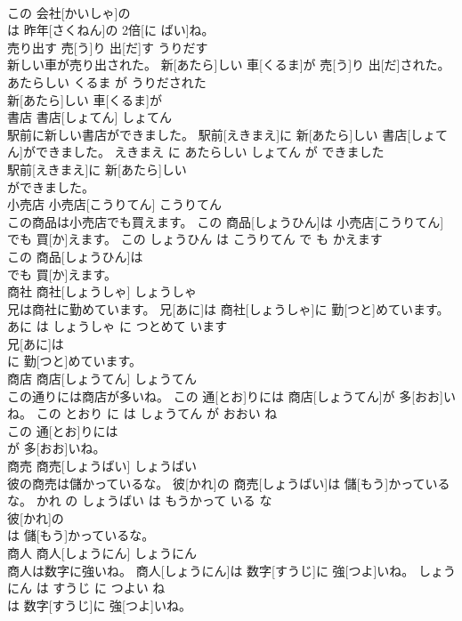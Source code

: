 \documentclass[8pt]{extreport}
\begin{document}
\begin{CJK}{UTF8}{min}
\\	この 会社[かいしゃ]の
\\	は 昨年[さくねん]の 2倍[に ばい]ね。			
\\	売り出す	売[う]り 出[だ]す	うりだす	
\\	新しい車が売り出された。	新[あたら]しい 車[くるま]が 売[う]り 出[だ]された。	あたらしい くるま が うりだされた	
\\	新[あたら]しい 車[くるま]が
\\	書店	書店[しょてん]	しょてん	
\\	駅前に新しい書店ができました。	駅前[えきまえ]に 新[あたら]しい 書店[しょてん]ができました。	えきまえ に あたらしい しょてん が できました	
\\	駅前[えきまえ]に 新[あたら]しい
\\	ができました。			
\\	小売店	小売店[こうりてん]	こうりてん	
\\	この商品は小売店でも買えます。	この 商品[しょうひん]は 小売店[こうりてん]でも 買[か]えます。	この しょうひん は こうりてん で も かえます	
\\	この 商品[しょうひん]は
\\	でも 買[か]えます。			
\\	商社	商社[しょうしゃ]	しょうしゃ	
\\	兄は商社に勤めています。	兄[あに]は 商社[しょうしゃ]に 勤[つと]めています。	あに は しょうしゃ に つとめて います	
\\	兄[あに]は
\\	に 勤[つと]めています。			
\\	商店	商店[しょうてん]	しょうてん	
\\	この通りには商店が多いね。	この 通[とお]りには 商店[しょうてん]が 多[おお]いね。	この とおり に は しょうてん が おおい ね	
\\	この 通[とお]りには
\\	が 多[おお]いね。			
\\	商売	商売[しょうばい]	しょうばい	
\\	彼の商売は儲かっているな。	彼[かれ]の 商売[しょうばい]は 儲[もう]かっているな。	かれ の しょうばい は もうかって いる な	
\\	彼[かれ]の
\\	は 儲[もう]かっているな。			
\\	商人	商人[しょうにん]	しょうにん	
\\	商人は数字に強いね。	商人[しょうにん]は 数字[すうじ]に 強[つよ]いね。	しょうにん は すうじ に つよい ね	
\\	は 数字[すうじ]に 強[つよ]いね。			

\end{CJK}
\end{document}
